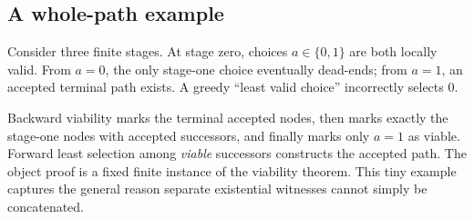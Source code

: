 \subsection{A whole-path example}

Consider three finite stages.  At stage zero, choices \(a\in\{0,1\}\) are both
locally valid.  From \(a=0\), the only stage-one choice eventually dead-ends;
from \(a=1\), an accepted terminal path exists.  A greedy ``least valid
choice'' incorrectly selects \(0\).

Backward viability marks the terminal accepted nodes, then marks exactly the
stage-one nodes with accepted successors, and finally marks only \(a=1\) as
viable.  Forward least selection among \emph{viable} successors constructs the
accepted path.  The object proof is a fixed finite instance of the viability
theorem.  This tiny example captures the general reason separate existential
witnesses cannot simply be concatenated.
